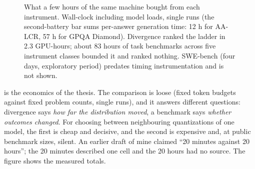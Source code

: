\begin{figure}[t]
\centering
{}
\caption{What a few hours of the same machine bought from each instrument. Wall-clock including model
loads, single runs (the second-battery bar sums per-answer generation time: 12 h for AA-LCR, 57 h for
GPQA Diamond). Divergence ranked the ladder in 2.3 GPU-hours; about 83 hours of task benchmarks
across five instrument classes bounded it and ranked nothing. SWE-bench (four days, exploratory period)
predates timing instrumentation and is not shown.}\label{fig:cost}
\end{figure}

 is the economics of the thesis. The comparison is loose (fixed token budgets against
fixed problem counts, single runs), and it answers different questions: divergence says \emph{how far
the distribution moved}, a benchmark says \emph{whether outcomes changed}. For choosing between
neighbouring quantizations of one model, the first is cheap and decisive, and the second is expensive
and, at public benchmark sizes, silent. An earlier draft of mine claimed ``20 minutes against 20
hours''; the 20 minutes described one cell and the 20 hours had no source. The figure shows the
measured totals.


